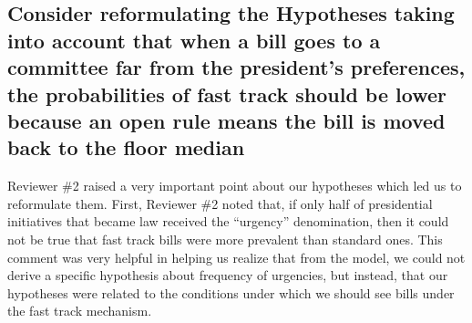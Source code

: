 \documentclass[article,letterpaper,times,12pt,listings-bw,microtype]{article}
\begin{document}


\subsection{Consider reformulating the Hypotheses taking into account that when a bill goes to a committee far from the president's preferences, the probabilities of fast track should be lower because an open rule means the bill is moved back to the floor median} Reviewer \#2 raised a very important point about our hypotheses which led us to reformulate them. First, Reviewer \#2 noted that, if only half of presidential initiatives that became law received the ``urgency'' denomination, then it could not be true that fast track bills were more prevalent than standard ones. This comment was very helpful in helping us realize that from the model, we could not derive a specific hypothesis about frequency of urgencies, but instead, that our hypotheses were related to the conditions under which we should see bills under the fast track mechanism. 
\end{document}
